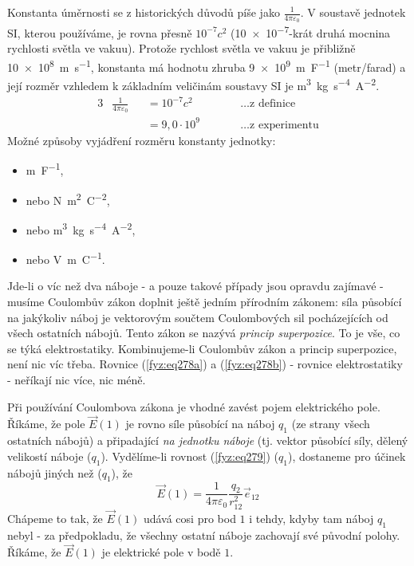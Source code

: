 {    Konstanta úměrnosti se z historických důvodů píše jako \(\frac{1}{4\pi\varepsilon_0}\). V 
    soustavě jednotek SI, kterou používáme, je rovna přesně \(10^{-7}c^2\) (\num{10e-7}-krát druhá 
    mocnina rychlosti světla ve vakuu). Protože rychlost světla ve vakuu je přibližně 
    \SI{10e8}{\meter\per\second}, konstanta má hodnotu zhruba \SI{9e9}{\meter\per\farad} 
    (metr/farad) a její rozměr vzhledem k základním veličinám soustavy SI je 
    \si{\cubic\meter\kilogram\second^{-4}\ampere^{-2}}.
    \begin{alignat*}{3}
     &\frac{1}{4\pi\varepsilon_0} &&= 10^{-7}c^2   \qquad && \ldots \text{z definice}     \\
     &                            &&= 9,0\cdot10^9 \qquad && \ldots \text{z experimentu} 
    \end{alignat*}
    Možné způsoby vyjádření rozměru konstanty jednotky: 
    \begin{itemize}
     \setlength{\itemsep}{0cm}%
     \setlength{\parskip}{0em}%
       \item \si{\meter\per\farad},    
       \item nebo \si{\newton\square\meter\per\square\coulomb},    
       \item nebo \si{\cubic\meter\kilogram\second^{-4}\ampere^{-2}},
       \item nebo \si{\volt\meter\per\coulomb}.
    \end{itemize}
    
    Jde-li o víc než dva náboje - a pouze takové případy jsou opravdu zajímavé - musíme Coulombův 
    zákon doplnit ještě jedním přírodním zákonem: síla působící na jakýkoliv náboj je vektorovým 
    součtem Coulombových sil pocházejících od všech ostatních nábojů. Tento zákon se nazývá 
    \emph{princip superpozice}. To je vše, co se týká elektrostatiky. Kombinujeme-li Coulombův 
    zákon a princip superpozice, není nic víc třeba. Rovnice (\ref{fyz:eq278a}) a 
    (\ref{fyz:eq278b}) - rovnice elektrostatiky - neříkají nic více, nic méně.
     
    Při používání Coulombova zákona je vhodné zavést pojem elektrického pole. Říkáme, že pole 
    \(\vec{E}(1)\) je rovno síle působící na náboj \(q_1\) (ze strany všech ostatních nábojů) a 
    připadající \emph{na jednotku náboje} (tj. vektor působící síly, dělený velikostí náboje 
    (\(q_1\)). Vydělíme-li rovnost (\ref{fyz:eq279}) (\(q_1\)), dostaneme pro účinek 
    nábojů jiných než (\(q_1\)), že
    \begin{equation}\label{fyz:eq280}
     \vec{E}(1) = \frac{1}{4\pi\varepsilon_0}\frac{q_2}{r^2_{12}}\vec{e}_{12}
    \end{equation}
    Chápeme to tak, že \(\vec{E}(1)\) udává cosi pro bod \(1\) i tehdy, kdyby tam náboj \(q_1\) 
    nebyl -  za předpokladu, že všechny ostatní náboje zachovají své původní polohy. Říkáme, že 
    \(\vec{E}(1)\) je elektrické pole v bodě \(1\).
     
}
